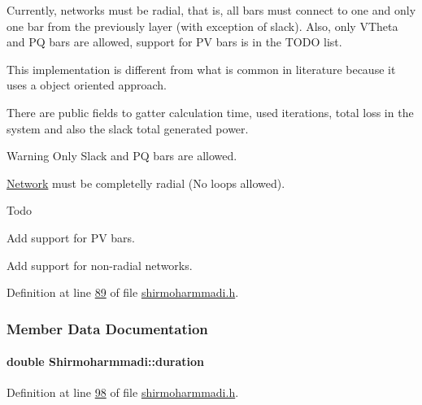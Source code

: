 Currently, networks must be radial, that is, all bars must connect to one and only one bar from the previously layer (with exception of slack). Also, only V\+Theta and P\+Q bars are allowed, support for P\+V bars is in the T\+O\+D\+O list.

This implementation is different from what is common in literature because it uses a object oriented approach.

There are public fields to gatter calculation time, used iterations, total loss in the system and also the slack total generated power.

\begin{DoxyWarning}{Warning}
Only Slack and P\+Q bars are allowed. 

\hyperlink{class_network}{Network} must be completelly radial (No loops allowed).
\end{DoxyWarning}
\begin{DoxyRefDesc}{Todo}
\item[\hyperlink{todo__todo000002}{Todo}]Add support for P\+V bars. 

Add support for non-\/radial networks. \end{DoxyRefDesc}


Definition at line \hyperlink{shirmoharmmadi_8h_source_l00089}{89} of file \hyperlink{shirmoharmmadi_8h_source}{shirmoharmmadi.\+h}.



\subsubsection{Member Data Documentation}
\hypertarget{class_shirmoharmmadi_a32ab19ff485833106bf68cd91dbc94e6}{}
\paragraph[{duration}]{\setlength{\rightskip}{0pt plus 5cm}double Shirmoharmmadi\+::duration}\label{class_shirmoharmmadi_a32ab19ff485833106bf68cd91dbc94e6}


Definition at line \hyperlink{shirmoharmmadi_8h_source_l00098}{98} of file \hyperlink{shirmoharmmadi_8h_source}{shirmoharmmadi.\+h}.

\hypertarget{class_shirmoharmmadi_aeb47da6439c2e92c7ebcc59ebb71624b}{}

